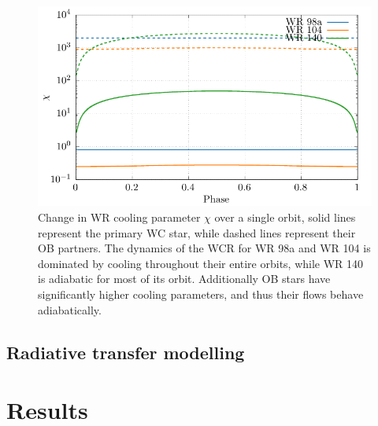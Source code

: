 \begin{figure}[h]
  \centering
  \includegraphics{assets/orbits/chi-vs-phase.pdf}
  \caption[$\chi$ change over system orbit]{Change in WR cooling parameter $\chi$ over a single orbit, solid lines represent the primary WC star, while dashed lines represent their OB partners. The dynamics of the WCR for WR 98a and WR 104 is dominated by cooling throughout their entire orbits, while WR 140 is adiabatic for most of its orbit. Additionally OB stars have significantly higher cooling parameters, and thus their flows behave adiabatically.}
  \label{fig:chiphase}
\end{figure}







\subsection{Radiative transfer modelling}

\section{Results}


